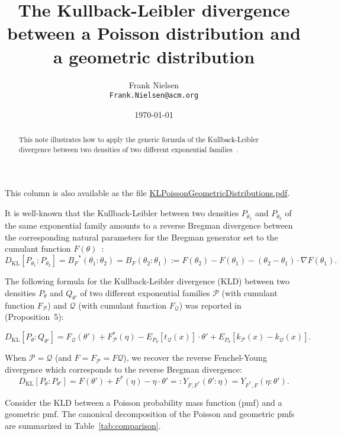 \documentclass{article}
\title{The Kullback-Leibler divergence between a Poisson distribution and a geometric distribution}
\author{Frank Nielsen\\ {\tt Frank.Nielsen@acm.org}}
\date{\today}
\def\calP{\mathcal{P}}
\def\calQ{\mathcal{Q}}
\def\KL{\mathrm{KL}}
\begin{document}
\maketitle

\begin{abstract}
This note illustrates how to apply the generic formula of the Kullback-Leibler divergence between two densities of two different exponential families~\cite{nielsen2021variational}.
\end{abstract}

This column is also available as the file \url{KLPoissonGeometricDistributions.pdf}.\vskip 0.3cm


It is well-known that the Kullback-Leibler between two densities $P_{\theta_1}$ and $P_{\theta_2}$ of the same exponential family amounts to a reverse Bregman divergence between the corresponding natural parameters for the Bregman generator set to the cumulant function $F(\theta)$~\cite{banerjee2005clustering}:
$$
D_\KL[P_{\theta_1}:P_{\theta_2}] = {B_F}^*(\theta_1:\theta_2)= B_F(\theta_2:\theta_1):=F(\theta_2)-F(\theta_1)-(\theta_2-\theta_1)\cdot \nabla F(\theta_1). 
$$

The following formula for the Kullback-Leibler divergence (KLD) between two densities $P_{\theta}$ and $Q_{\theta'}$ of two different exponential families $\calP$ (with cumulant function $F_\calP$) and $\calQ$ (with cumulant function $F_\calQ$) was reported in~\cite{nielsen2021variational} (Proposition~5):

\begin{equation}
D_\KL[P_{\theta}:Q_{\theta'}] = 
F_\calQ(\theta')+F_\calP^*(\eta)-E_{P_{\theta}}[t_\calQ(x)]\cdot\theta' +E_{P_{\theta}}[k_\calP(x)-k_\calQ(x)].
\end{equation}

When $\calP=\calQ$ (and $F=F_\calP=F\calQ$), we recover the reverse Fenchel-Young divergence which corresponds to the reverse Bregman divergence:
$$
D_\KL[P_{\theta}:P_{\theta'}]=F(\theta')+F^*(\eta)-\eta\cdot\theta'=:Y_{F,F^*}(\theta':\eta)=Y_{F^*,F}(\eta:\theta').
$$

Consider the KLD between a Poisson probability mass function (pmf) and a geometric pmf.
The canonical decomposition of the Poisson and geometric pmfs are summarized in Table~\ref{tab:comparison}.
\end{document}
